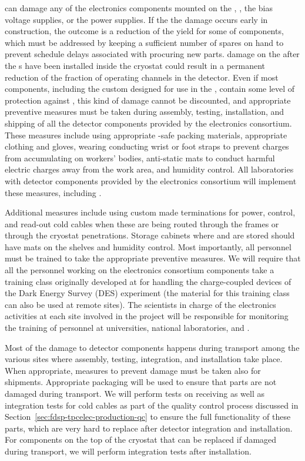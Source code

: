  can damage any of the electronics
components mounted on the , ,
the bias voltage supplies, or the power supplies. If the
the damage occurs early in construction, 
the outcome is a reduction
of the yield for some of components, which must be
addressed by keeping a sufficient number of spares on hand to prevent
schedule delays associated with procuring new parts. 
damage on the  after the s have been
installed inside the cryostat could result in a permanent
reduction of the fraction of operating channels in the
detector. Even if most components, including the custom 
 designed for use in the , contain 
some level of protection  against , this kind of damage cannot be discounted, and appropriate 
preventive measures must be taken during  
assembly, testing, installation, and shipping of all the detector 
components provided by the  electronics consortium. These 
measures include using appropriate -safe packing materials, 
appropriate clothing and gloves, wearing conducting wrist or foot straps 
to prevent charges from accumulating 
on workers' bodies, anti-static mats to conduct harmful electric 
charges away from the work area, and humidity control. All laboratories with detector components provided by the  electronics consortium will implement these
measures, including . 

Additional measures
include using custom made terminations for 
power, control, and read-out cold cables when these
are being routed through the  frames or through the
cryostat penetrations. Storage cabinets where  and
 are stored should have  mats
on the shelves and humidity control. Most importantly, all personnel must be trained to take the appropriate preventive measures. We 
will require that all the personnel working on the  electronics 
consortium components take a training class originally developed 
at  for handling the charge-coupled devices of the Dark Energy Survey (DES) experiment 
(the material for this training class can also be used at remote 
sites). The scientists in charge of the  electronics activities at each site involved in the project will be responsible for monitoring the training of personnel at universities, national laboratories,
and .

Most of the damage to detector components happens during 
transport among the various sites where assembly, testing, integration,
and installation take place. When appropriate, measures to prevent
 damage must be taken also for shipments. Appropriate 
packaging will be used to ensure that parts are not damaged
during transport. We will perform tests on receiving  
 as well as integration tests for cold cables as
part of the quality control process discussed in 
Section~\ref{sec:fdsp-tpcelec-production-qc} to ensure the 
full functionality of these parts, which are very hard to replace 
after detector integration and installation. For  
components on the top of the cryostat that
can be replaced if damaged during transport, we will 
perform integration tests after installation.

